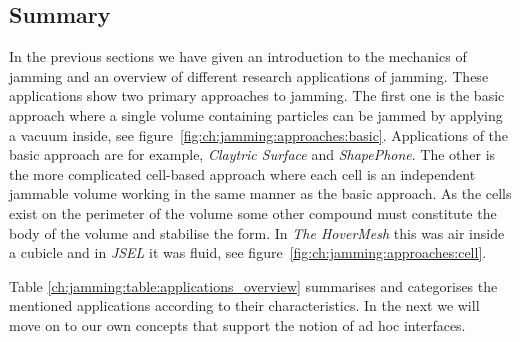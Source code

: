 \subsection{Summary}

In the previous sections we have given an introduction to the mechanics of jamming and an overview of different research applications of jamming.
These applications show two primary approaches to jamming.
The first one is the basic approach where a single volume containing particles can be jammed by applying a vacuum inside, see figure~\ref{fig:ch:jamming:approaches:basic}.
Applications of the basic approach are for example, \emph{Claytric Surface} and \emph{ShapePhone}.
The other is the more complicated cell-based approach where each cell is an independent jammable volume working in the same manner as the basic approach.
As the cells exist on the perimeter of the volume some other compound must constitute the body of the volume and stabilise the form.
In \emph{The HoverMesh} this was air inside a cubicle and in \emph{JSEL} it was fluid, see figure~\ref{fig:ch:jamming:approaches:cell}.



Table \ref{ch:jamming:table:applications_overview} summarises and categorises the mentioned applications according to their characteristics.
In the next we will move on to our own concepts that support the notion of ad hoc interfaces.

